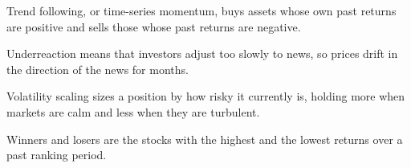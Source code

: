 \begin{keyterms}
\begin{description}[leftmargin=0pt, itemsep=0pt, parsep=0pt, topsep=0pt, font=\normalfont\bfseries\color{FEMaroon}]
  \item[Trend following.] Trend following, or time-series momentum, buys assets whose own past returns are positive and sells those whose past returns are negative.
  \item[Underreaction.] Underreaction means that investors adjust too slowly to news, so prices drift in the direction of the news for months.
  \item[Volatility scaling.] Volatility scaling sizes a position by how risky it currently is, holding more when markets are calm and less when they are turbulent.
  \item[Winners and losers.] Winners and losers are the stocks with the highest and the lowest returns over a past ranking period.
\end{description}
\end{keyterms}
